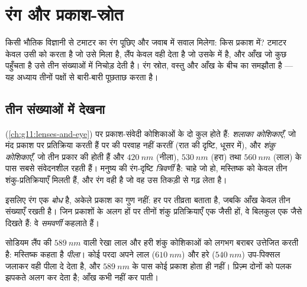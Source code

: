 \chapter{रंग और प्रकाश-स्रोत}\label{ch:g11:color-light-sources}

किसी भौतिक विज्ञानी से टमाटर का रंग पूछिए और जवाब में सवाल मिलेगा: किस
प्रकाश में? टमाटर केवल उसी को  करता है जो उसे मिला है, लैंप
केवल वही देता है जो उसके  में है, और आँख जो कुछ पहुँचता है
उसे तीन संख्याओं में निचोड़ देती है। रंग स्रोत, वस्तु और आँख के बीच का
समझौता है --- यह अध्याय तीनों पक्षों से बारी-बारी पूछताछ करता है।

\section{तीन संख्याओं में देखना}

\begin{definition}[शंकु कोशिकाएँ और त्रिवर्णी दृष्टि]\label{def:g11:color-light-sources:cones}
 (\cref{ch:g11:lenses-and-eye}) पर प्रकाश-संवेदी कोशिकाओं के दो कुल होते हैं:
\emph{शलाका कोशिकाएँ}, जो मंद प्रकाश पर प्रतिक्रिया
करती हैं पर  की परवाह नहीं करतीं (रात की दृष्टि,
धूसर में), और \emph{शंकु कोशिकाएँ}, जो तीन प्रकार की
होती हैं और $\qty{420}{nm}$ (नीला), $\qty{530}{nm}$ (हरा) तथा $\qty{560}{nm}$ (लाल) के पास सबसे
संवेदनशील रहती हैं। मनुष्य की रंग-दृष्टि
\emph{त्रिवर्णी} है:  चाहे जो
हो, मस्तिष्क को केवल तीन शंकु-प्रतिक्रियाएँ मिलती हैं, और रंग वही है जो
वह उस तिकड़ी से गढ़ लेता है।
\end{definition}

\begin{definition}[एक बोध के रूप में रंग]\label{def:g11:color-light-sources:perception}
इसलिए रंग एक \emph{बोध} है, अकेले प्रकाश का गुण नहीं: 
हर  पर तीव्रता बताता है, जबकि आँख केवल तीन संख्याएँ
रखती है। जिन प्रकाशों के  अलग हों पर तीनों शंकु
प्रतिक्रियाएँ एक जैसी हों, वे बिलकुल एक जैसे दिखते हैं: वे
\emph{समवर्णी} कहलाते हैं।
\end{definition}

\begin{example}[दो पीले]\label{ex:g11:color-light-sources:yellows}
सोडियम लैंप की $\qty{589}{nm}$ वाली रेखा लाल और हरी शंकु कोशिकाओं को लगभग
बराबर उत्तेजित करती है: मस्तिष्क कहता है \emph{पीला}। कोई परदा अपने लाल
($\qty{610}{nm}$) और हरे ($\qty{540}{nm}$) उप-पिक्सल जलाकर वही पीला दे देता है, और
$\qty{589}{nm}$ के पास कोई प्रकाश होता ही नहीं। प्रिज़्म दोनों को पलक झपकते अलग
कर देता है; आँख कभी नहीं कर पाती।
\end{example}

